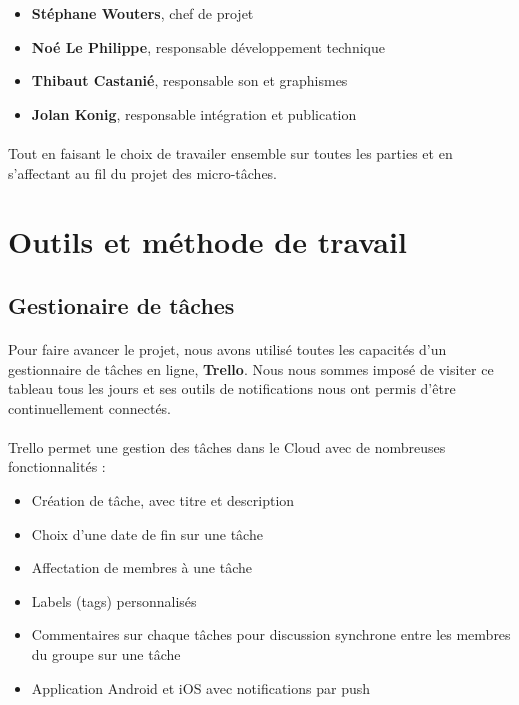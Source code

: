 \begin{itemize}
\item \textbf{Stéphane Wouters}, chef de projet
\item \textbf{Noé Le Philippe}, responsable développement technique
\item \textbf{Thibaut Castanié}, responsable son et graphismes
\item \textbf{Jolan Konig}, responsable intégration et publication
\end{itemize}

\paragraph{}
Tout en faisant le choix de travailer ensemble sur toutes les parties et en s’affectant au fil du projet des micro-tâches.

\section{Outils et méthode de travail}

\subsection{Gestionaire de tâches}

\paragraph{}
Pour faire avancer le projet, nous avons utilisé toutes les capacités d’un gestionnaire de tâches en ligne, \textbf{Trello}. Nous nous sommes imposé de visiter ce tableau tous les jours et ses outils de notifications nous ont permis d’être continuellement connectés.

\paragraph{}
Trello permet une gestion des tâches dans le Cloud avec de nombreuses fonctionnalités :
\begin{itemize}
\item Création de tâche, avec titre et description
\item Choix d’une date de fin sur une tâche
\item Affectation de membres à une tâche
\item Labels (tags) personnalisés
\item Commentaires sur chaque tâches pour discussion synchrone entre les membres du groupe sur une tâche
\item Application Android et iOS avec notifications par push
\end{itemize}

